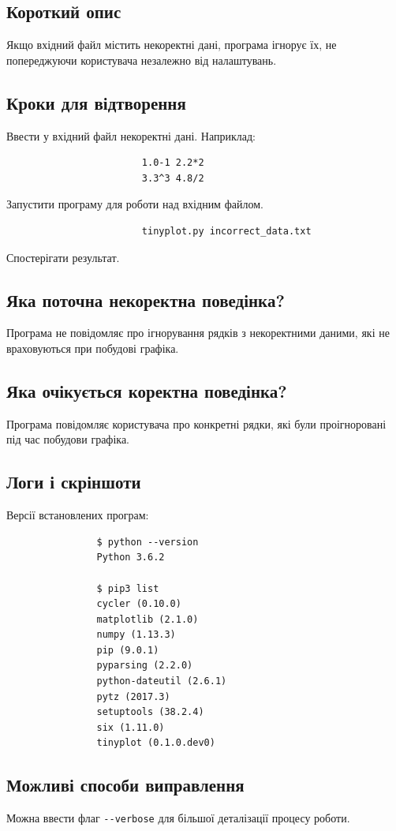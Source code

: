 \documentclass[a4paper,oneside,DIV=12,12pt]{scrartcl}
\begin{document}
		\subsection{Короткий опис}
			Якщо вхідний файл містить некоректні дані, програма ігнорує їх, не попереджуючи користувача незалежно від налаштувань.
			
		\subsection{Кроки для відтворення}
			\begin{steps}
				\item Ввести у вхідний файл некоректні дані. Наприклад:
					\begin{lstlisting}
						1.0-1 2.2*2
						3.3^3 4.8/2
					\end{lstlisting}
					
				\item Запустити програму для роботи над вхідним файлом.
					\begin{lstlisting}
						tinyplot.py incorrect_data.txt
					\end{lstlisting}
				
				\item Спостерігати результат.
			\end{steps}
			
		\subsection{Яка поточна некоректна поведінка?}
			Програма не повідомляє про ігнорування рядків з некоректними даними, які не враховуються при побудові графіка.
			
		\subsection{Яка очікується коректна поведінка?}
			Програма повідомляє користувача про конкретні рядки, які були проігноровані під час побудови графіка.
			
		\subsection{Логи і скріншоти}
			Версії встановлених програм:
			\begin{lstlisting}
				$ python --version
				Python 3.6.2

				$ pip3 list
				cycler (0.10.0)
				matplotlib (2.1.0)
				numpy (1.13.3)
				pip (9.0.1)
				pyparsing (2.2.0)
				python-dateutil (2.6.1)
				pytz (2017.3)
				setuptools (38.2.4)
				six (1.11.0)
				tinyplot (0.1.0.dev0)
			\end{lstlisting}
			
		\subsection{Можливі способи виправлення}
			Можна ввести флаг \verb|--verbose| для більшої деталізації процесу роботи.
\end{document}
